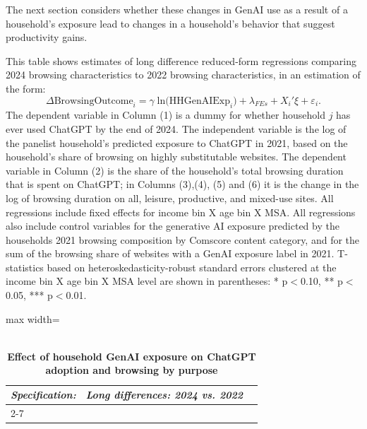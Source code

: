 \documentclass[12pt]{article}
\begin{document}
The next section considers whether these changes in GenAI use as a result of a household's exposure lead to changes in a household's behavior that suggest productivity gains.

\begin{table}[htbp]
\caption{\\ \centering \textbf{Effect of household GenAI exposure on ChatGPT adoption and browsing by purpose}}  

\setlength{\abovedisplayskip}{0pt}
\setlength{\belowdisplayskip}{0.5pt}
\setlength{\abovedisplayshortskip}{0pt}
\setlength{\belowdisplayshortskip}{0.5pt}
\vspace{-0.1cm} \label{table:2sls-first-rf} \footnotesize  This table shows estimates of long difference reduced-form regressions comparing 2024 browsing characteristics to 2022 browsing characteristics, in an estimation of the form:
$$\Delta\text{BrowsingOutcome}_{i} = \gamma\; \text{ln(HHGenAIExp}_{i})  + \lambda_{FEs} + X_i'\xi + \varepsilon_{i}.$$
The dependent variable in Column (1) is a dummy for whether household $j$ has ever used ChatGPT by the end of 2024. The independent variable is the log of the panelist household's predicted exposure to ChatGPT in 2021, based on the household's share of browsing on highly substitutable websites. The dependent variable in Column (2) is the share of the household's total browsing duration that is spent on ChatGPT; in Columns (3),(4), (5) and (6) it is the change in the log of browsing duration on all, leisure, productive, and mixed-use sites. All regressions include fixed effects for income bin X age bin X MSA. All regressions also include control variables for the generative AI exposure predicted by the households 2021 browsing composition by Comscore content category, and for the sum of the browsing share of websites with a GenAI exposure label in 2021. T-statistics based on heteroskedasticity-robust standard errors clustered at the income bin X age bin X MSA level are shown in parentheses: * p$<$0.10, ** p$<$0.05, *** p$<$0.01. \vspace{0.1cm} 

\footnotesize
 \centering \setlength{\tabcolsep}{3pt}
\begin{adjustbox}{max width=\textwidth}
\begin{tabular}{@{}l*{7}{c}@{}} 
\toprule
\textit{Specification:} &  \multicolumn{6}{c}{\textit{Long differences: 2024 vs. 2022}}\\
\cmidrule(lr){2-7} 


\end{tabular}
\end{adjustbox}
\end{table}
\end{document}
